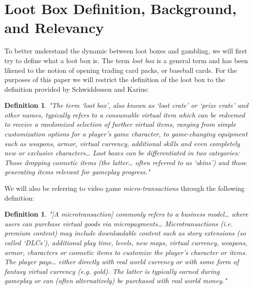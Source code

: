 \documentclass[11pt]{article}
\newtheorem{defn}[thm]{Definition}{\bfseries}{\rmfamily}
\begin{document}
\section{Loot Box Definition, Background, and Relevancy}\label{lootbox-dbr-sect}
To better understand the dynamic between loot boxes and gambling, we will first
try to define what a loot box is. The term \emph{loot box} is a general term and has
been likened to the notion of opening trading card packs, or baseball cards. For
the purposes of this paper we will restrict the definition of the loot box to the 
definition provided by Schwiddessen and Karius:

\begin{defn}\label{lootbox-defn}
"The term ‘loot box’, also known as ‘loot crate’ or ‘prize crate’ and other names,
typically refers to a consumable virtual item which can be redeemed to receive a
randomized selection of further virtual items, ranging from simple customization
options for a player’s game character, to game-changing equipment such as weapons,
armor, virtual currency, additional skills and even completely new or exclusive
characters… Loot boxes can be differentiated in two categories: Those dropping
cosmetic items (the latter… often referred to as ‘skins’) and those generating items
relevant for gameplay progress." \cite{article}
\end{defn}

We will also be referring to video game \textit{micro-transactions} through the following definition:

\begin{defn}\label{mt-defn}
"[A microtransaction] commonly refers to a business model… where users can
purchase virtual goods via micropayments… Microtransactions (i.e. premium content)
may include downloadable content such as story extensions (so called ‘DLCs’),
additional play time, levels, new maps, virtual currency, weapons, armor, characters
or cosmetic items to customize the player’s character or items. The player pays…
either directly with real world currency or with some form of fantasy virtual currency
(e.g. gold). The latter is typically earned during gameplay or can (often alternatively)
be purchased with real world money." \cite{article} 
\end{defn}
\end{document}
